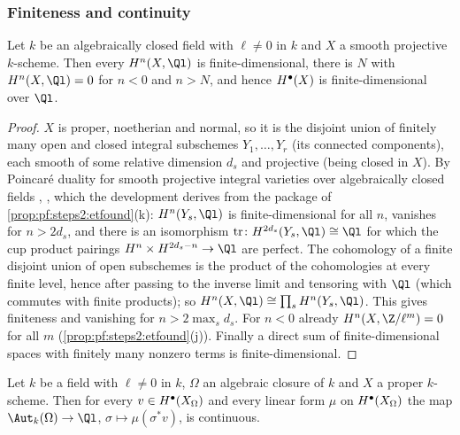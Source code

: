 \subsubsection{Finiteness and continuity}

\begin{lemma}[Finiteness]\label{lem:pf:steps2:fin}
Let $k$ be an algebraically closed field with $\ell\ne0$ in $k$ and $X$ a smooth projective
$k$-scheme. Then every $H^n(X,\Ql)$ is finite-dimensional, there is $N$ with $H^n(X,\Ql)=0$ for $n<0$
and $n>N$, and hence $H^{\bullet}(X)$ is finite-dimensional over $\Ql$.
\end{lemma}

\begin{proof}
$X$ is proper, noetherian and normal, so it is the disjoint union of finitely many open and closed
integral subschemes $Y_1,\dots,Y_r$ (its connected components), each smooth of some relative
dimension $d_s$ and projective (being closed in $X$). By Poincar\'e duality for smooth projective
integral varieties over algebraically closed fields
\cite[Exp.~XVIII]{ArtinGrothendieckVerdier1972}, \cite[Ch.~VI, \S11]{Milne1980}, which the
development derives from the package of \cref{prop:pf:steps2:etfound}(k): $H^n(Y_s,\Ql)$ is
finite-dimensional for all $n$, vanishes for $n>2d_s$, and there is an isomorphism
$\mathrm{tr}\colon H^{2d_s}(Y_s,\Ql)\cong\Ql$ for which the cup product pairings
$H^n\times H^{2d_s-n}\to\Ql$ are perfect. The cohomology of a finite disjoint union of open
subschemes is the product of the cohomologies at every finite level, hence after passing to the
inverse limit and tensoring with $\Ql$ (which commutes with finite products); so
$H^n(X,\Ql)\cong\prod_sH^n(Y_s,\Ql)$. This gives finiteness and vanishing for $n>2\max_sd_s$. For
$n<0$ already $H^n(X,\Z/\ell^m)=0$ for all $m$ (\cref{prop:pf:steps2:etfound}(j)). Finally a direct
sum of finite-dimensional spaces with finitely many nonzero terms is finite-dimensional.
\end{proof}

\begin{lemma}[Continuity]\label{lem:pf:steps2:cont}
Let $k$ be a field with $\ell\ne0$ in $k$, $\Omega$ an algebraic closure of $k$ and $X$ a proper
$k$-scheme. Then for every $v\in H^{\bullet}(X_\Omega)$ and every linear form $\mu$ on
$H^{\bullet}(X_\Omega)$ the map $\Aut_k(\Omega)\to\Ql$, $\sigma\mapsto\mu(\sigma^\ast v)$, is continuous.
\end{lemma}

